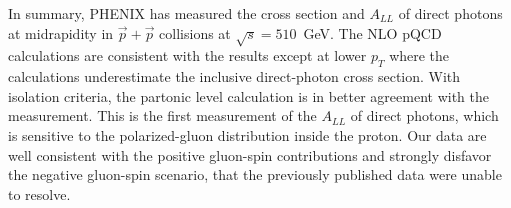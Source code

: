 \documentclass[twocolumn,letterpaper,aps,prl,longbibliography,superscriptaddress,floatfix]{revtex4-2}
\newcommand{\pT}{\mbox{$p_T$}\xspace}
\newcommand{\ALL}{\mbox{$A_{LL}$}\xspace}
\begin{document}

In summary, PHENIX has measured the cross section and \ALL of direct 
photons at midrapidity in $\vec{p}+\vec{p}$ collisions at 
$\sqrt{s}=510$~GeV. The NLO pQCD calculations are consistent with the 
results except at lower \pT where the calculations underestimate the 
inclusive direct-photon cross section. With isolation criteria, the 
partonic level calculation is in better agreement with the measurement. 
This is the first measurement of the \ALL of direct photons, which is 
sensitive to the polarized-gluon distribution inside the proton.
Our data are well consistent with the positive gluon-spin contributions
and strongly disfavor the negative gluon-spin scenario, that the
previously published data were unable to resolve.


\end{document}

